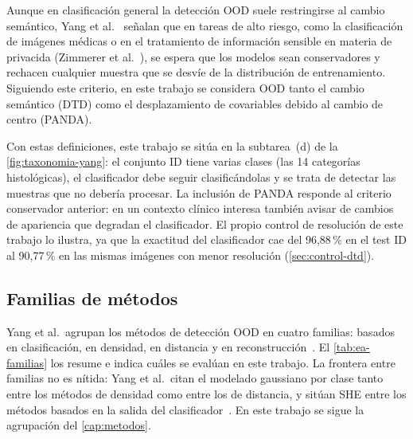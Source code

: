 Aunque en clasificación general la detección OOD suele restringirse al cambio
semántico, Yang et al.~\cite{yang2024} señalan que en tareas de alto riesgo, como
la clasificación de imágenes médicas o en el tratamiento de información sensible en materia de privacida (Zimmerer et al.~\cite{zimmerer2022}), se
espera que los modelos sean conservadores y rechacen cualquier muestra que se
desvíe de la distribución de entrenamiento. Siguiendo este criterio, en este
trabajo se considera OOD tanto el cambio semántico (DTD) como el desplazamiento
de covariables debido al cambio de centro (PANDA).

Con estas definiciones, este trabajo se sitúa en la subtarea~(d) de la
\cref{fig:taxonomia-yang}: el conjunto ID tiene varias clases (las 14 categorías
histológicas), el clasificador debe seguir clasificándolas y se trata de detectar
las muestras que no debería procesar. La inclusión de PANDA responde al criterio
conservador anterior: en un contexto clínico interesa también avisar de cambios
de apariencia que degradan el clasificador. El propio control de resolución de
este trabajo lo ilustra, ya que la exactitud del clasificador cae del 96,88\,\% en
el test ID al 90,77\,\% en las mismas imágenes con menor resolución
(\cref{sec:control-dtd}).

\subsection{Familias de métodos}\label{sec:ea-metodos}
Yang et al.\ agrupan los métodos de detección OOD en cuatro familias: basados en
clasificación, en densidad, en distancia y en
reconstrucción~\cite{yang2024}. El \cref{tab:ea-familias} los resume e indica
cuáles se evalúan en este trabajo. La frontera entre familias no es nítida: Yang
et al.\ citan el modelado gaussiano por clase tanto entre los métodos de densidad
como entre los de distancia, y sitúan SHE entre los métodos basados en la salida
del clasificador~\cite{yang2024}. En este trabajo se sigue la agrupación del
\cref{cap:metodos}.

